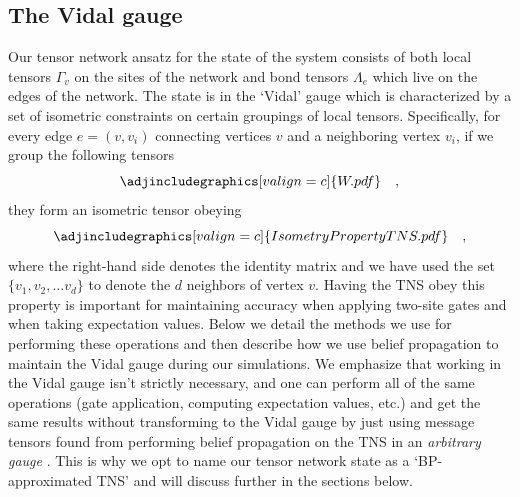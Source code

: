 \documentclass[%
 superscriptaddress,
 amsmath,amssymb,
 prx, nofootinbib,
 twocolumn
]{revtex4-2}
\begin{document}
\subsection*{The Vidal gauge}
Our tensor network ansatz for the state of the system consists of both local tensors $\Gamma_{v}$ on the sites of the network and bond tensors $\Lambda_{e}$ which live on the edges of the network. The state is in the `Vidal' gauge which is characterized by a set of isometric constraints on certain groupings of local tensors. Specifically, for every edge $e = (v, v_{i})$ connecting vertices $v$ and a neighboring vertex $v_i$, if we group the following tensors
\begin{equation}
    \adjincludegraphics[valign=c]{W.pdf} \quad,
    \label{Eq:IsometryPropertyDefinition}
\end{equation}
they form an isometric tensor obeying
\begin{equation}
    \adjincludegraphics[valign=c]{IsometryPropertyTNS.pdf} \quad ,
    \label{Eq:IsometryDefinition}
\end{equation}
where the right-hand side denotes the identity matrix and we have used the set $\{v_{1}, v_{2}, \hdots v_{d}\}$ to denote the $d$ neighbors of vertex $v$. Having the TNS obey this property is important for maintaining accuracy when applying two-site gates and when taking expectation values. Below we detail the methods we use for performing these operations and then describe how we use belief propagation to maintain the Vidal gauge during our simulations. We emphasize that working in the Vidal gauge isn't strictly necessary, and one can perform all of the same operations (gate application, computing expectation values, etc.) and get the same results without transforming to the Vidal gauge by just using message tensors found from performing belief propagation on the TNS in an \textit{arbitrary gauge} \cite{TindallGauging2023}. This is why we opt to name our tensor network state as a `BP-approximated TNS' and will discuss further in the sections below. 
\end{document}
